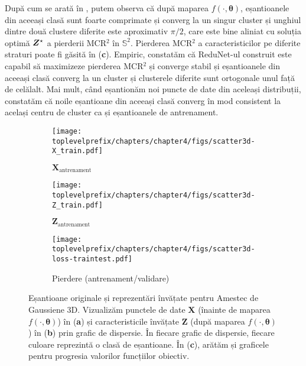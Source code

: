 \documentclass[../../book-main_ro.tex]{subfiles}
\begin{document}
\begin{example}
După cum se arată în , putem observa că după maparea $f(\cdot, \bm{\theta})$, eșantioanele din aceeași clasă sunt foarte comprimate și converg la un singur cluster și unghiul dintre două clustere diferite este aproximativ $\pi/2$, care este bine aliniat cu soluția optimă $\bm{Z}^{\star}$ a pierderii MCR$^2$ în $\mathbb{S}^2$. 
Pierderea MCR$^2$ a caracteristicilor pe diferite straturi poate fi găsită în (\textbf{c}). Empiric, constatăm că ReduNet-ul construit este capabil să maximizeze pierderea MCR$^2$ și converge stabil și eșantioanele din aceeași clasă converg la un cluster și clusterele diferite sunt ortogonale unul față de celălalt. 
Mai mult, când eșantionăm noi puncte de date din aceleași distribuții, constatăm că noile eșantioane din aceeași clasă converg în mod consistent la același centru de cluster ca și eșantioanele de antrenament. 
\begin{figure}[t]
    \begin{subfigure}[t]{0.32\textwidth}
        \centering 
        \texttt{[image: \\toplevelprefix/chapters/chapter4/figs/scatter3d-X\_train.pdf]}\vspace{-0.1in}
        \caption{$\bm{X}_{\text{antrenament}}$}
    \end{subfigure}
    \hfill
    \begin{subfigure}[t]{0.32\textwidth}
        \centering 
        \texttt{[image: \\toplevelprefix/chapters/chapter4/figs/scatter3d-Z\_train.pdf]}\vspace{-0.1in}
        \caption{$\bm{Z}_{\text{antrenament}}$}
    \end{subfigure}
    \hfill
    \begin{subfigure}[t]{0.32\textwidth}
        \centering 
        \texttt{[image: \\toplevelprefix/chapters/chapter4/figs/scatter3d-loss-traintest.pdf]}\vspace{-0.1in}
        \caption{Pierdere (antrenament/validare)}
    \end{subfigure}
    \vspace{-0.1in}
    \caption{\small Eșantioane originale și reprezentări învățate pentru Amestec de Gaussiene 3D. Vizualizăm punctele de date $\bm{X}$ (înainte de maparea $f(\cdot, \bm{\theta})$) în (\textbf{a}) și caracteristicile învățate $\bm{Z}$ (după maparea $f(\cdot, \bm{\theta})$) în (\textbf{b}) prin grafic de dispersie. În fiecare grafic de dispersie, fiecare culoare reprezintă o clasă de eșantioane. În (\textbf{c}), arătăm și graficele pentru progresia valorilor funcțiilor obiectiv.}
    \label{fig:redu-3d-gaussian-diagram}
\end{figure}

\end{example}
\end{document}
